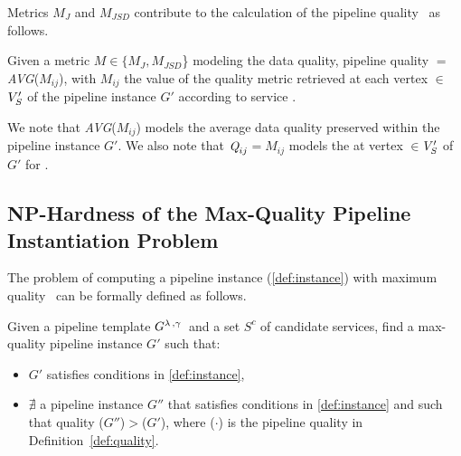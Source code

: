 Metrics $M_J$ and $M_{JSD}$ contribute to the calculation of the pipeline quality \q\ as follows. %

\begin{definition}[\emph{\quality}]\label{def:quality}
  Given a metric $M$$\in$$\{M_J,M_{JSD}$\} modeling the data quality, pipeline quality \q$=$\emph{AVG}($M_{ij}$), with $M_{ij}$ the value of the quality metric retrieved at each vertex $\in$$V'_S$ of the pipeline instance $G'$ according to service .
\end{definition}

We note that \emph{AVG}($M_{ij}$) models the average data quality preserved within the pipeline instance $G'$.
We also note that $\textit{Q}_{ij}$$=$$M_{ij}$ models the \quality at vertex $\in$$V'_S$ of $G'$ for .

\subsection{NP-Hardness of the Max-Quality Pipeline Instantiation Problem}\label{sec:nphard}
The problem of computing a pipeline instance (\cref{def:instance}) with maximum quality \q\ can be formally defined as follows.

\begin{definition}\label{def:MaXQualityInstance}
  Given a pipeline template $G^{\lambda\,,\gamma\,}$ and a set $S^c$ of candidate services, find a max-quality pipeline instance $G'$ such that:
  \begin{itemize}
    \item $G'$ satisfies conditions in \cref{def:instance},
    \item $\nexists$ a pipeline instance $G''$ that satisfies conditions in \cref{def:instance} and such that quality \q($G''$)$>$\q($G'$), where \q($\cdot$) is the pipeline quality in Definition~\ref{def:quality}.
  \end{itemize}
\end{definition}

